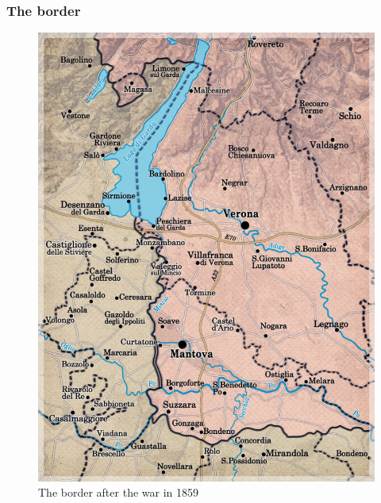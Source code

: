 \documentclass[10pt]{beamer}
\begin{document}
\begin{frame}
    \frametitle{The border}

    \begin{figure}
        \centering
        \includegraphics[width=0.5\linewidth]{pics/border.png}
        \caption{The border after the war in 1859}
        \label{fig:border}
    \end{figure}

\end{frame}
\end{document}
